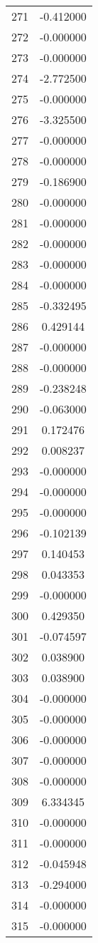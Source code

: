 \documentclass[12pt]{article}
\begin{document}
\begin{longtable}{@{}cc@{}}
271 & -0.412000 \\
272 & -0.000000 \\
273 & -0.000000 \\
274 & -2.772500 \\
275 & -0.000000 \\
276 & -3.325500 \\
277 & -0.000000 \\
278 & -0.000000 \\
279 & -0.186900 \\
280 & -0.000000 \\
281 & -0.000000 \\
282 & -0.000000 \\
283 & -0.000000 \\
284 & -0.000000 \\
285 & -0.332495 \\
286 & 0.429144 \\
287 & -0.000000 \\
288 & -0.000000 \\
289 & -0.238248 \\
290 & -0.063000 \\
291 & 0.172476 \\
292 & 0.008237 \\
293 & -0.000000 \\
294 & -0.000000 \\
295 & -0.000000 \\
296 & -0.102139 \\
297 & 0.140453 \\
298 & 0.043353 \\
299 & -0.000000 \\
300 & 0.429350 \\
301 & -0.074597 \\
302 & 0.038900 \\
303 & 0.038900 \\
304 & -0.000000 \\
305 & -0.000000 \\
306 & -0.000000 \\
307 & -0.000000 \\
308 & -0.000000 \\
309 & 6.334345 \\
310 & -0.000000 \\
311 & -0.000000 \\
312 & -0.045948 \\
313 & -0.294000 \\
314 & -0.000000 \\
315 & -0.000000 \\

\end{longtable}
\end{document}
